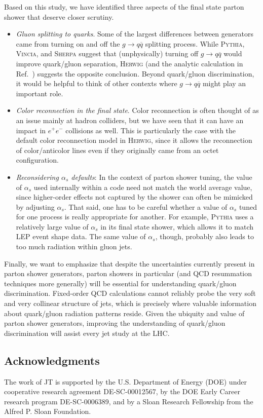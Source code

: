 \documentclass[11pt]{cernrep}
\begin{document}
Based on this study, we have identified three aspects of the final state parton shower that deserve closer scrutiny.
\begin{itemize}
\item \textit{Gluon splitting to quarks}.  Some of the largest differences between generators came from turning on and off the $g \to q \overline{q}$ splitting process.  While \textsc{Pythia}, \textsc{Vincia}, and \textsc{Sherpa} suggest that (unphysically) turning off $g \to q \overline{q}$ would improve quark/gluon separation, \textsc{Herwig} (and the analytic calculation in Ref.~\cite{Larkoski:2013eya}) suggests the opposite conclusion.  Beyond quark/gluon discrimination, it would be helpful to think of other contexts where $g \to q \overline{q}$ might play an important role.
\item \textit{Color reconnection in the final state}.  Color reconnection is often thought of as an issue mainly at hadron colliders, but we have seen that it can have an impact in $e^+ e^-$ collisions as well.  This is particularly the case with the default color reconnection model in \textsc{Herwig}, since it allows the reconnection of color/anticolor lines even if they originally came from an octet configuration.
\item \textit{Reconsidering $\alpha_s$ defaults}:  In the context of parton shower tuning, the value of $\alpha_s$ used internally within a code need not match the world average value, since higher-order effects not captured by the shower can often be mimicked by adjusting $\alpha_s$.  That said, one has to be careful whether a value of $\alpha_s$ tuned for one process is really appropriate for another.  For example, \textsc{Pythia} uses a relatively large value of $\alpha_s$ in its final state shower, which allows it to match LEP event shape data.  The same value of $\alpha_s$, though, probably also leads to too much radiation within gluon jets.
\end{itemize}
Finally, we want to emphasize that despite the uncertainties currently present in parton shower generators, parton showers in particular (and QCD resummation techniques more generally) will be essential for understanding quark/gluon discrimination.  Fixed-order QCD calculations cannot reliably probe the very soft and very collinear structure of jets, which is precisely where valuable information about quark/gluon radiation patterns reside.  Given the ubiquity and value of parton shower generators, improving the understanding of quark/gluon discrimination will assist every jet study at the LHC.

\subsection*{Acknowledgments}

The work of JT is supported by the U.S. Department of Energy (DOE) under cooperative research agreement DE-SC-00012567, by the DOE Early Career research program DE-SC-0006389, and by a Sloan Research Fellowship from the Alfred P. Sloan Foundation.


\end{document}
